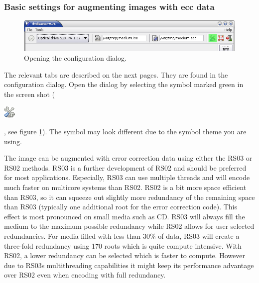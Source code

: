 

\subsubsection{Basic settings for augmenting images with ecc data}
\label{howto-augment-basic-settings}

\begin{figure}[h]
\centerline{\includegraphics[width=\textwidth]{screenshots/global-prefs-invoke.png}}
\caption{Opening the configuration dialog.}  
\label{howto-eccfile-open-preferences-augment}
\end{figure}

The relevant tabs are described on the next pages. They are
found in the configuration dialog.
Open the dialog by selecting the symbol marked green in the
screen shot ( \begin{minipage}{8mm}\includegraphics{icons/prefs-icon.png}\end{minipage}, see figure \ref{howto-eccfile-open-preferences-augment}).
The symbol may look different due to the symbol theme you are using.

\medskip

The image can be augmented with error correction data using either
the RS03 or RS02 methods. RS03 is a further development of RS02
and should be preferred for most applications. Especially, RS03
can use multiple threads and will encode much faster on multicore systems
than RS02. RS02 is a bit more space efficient than RS03, so it can
squeeze out slightly more redundancy of the remaining space than
RS03 (typically one additional root for the error correction code). This
effect is most pronounced on small media such as CD. RS03 will always fill
the medium to the maximum possible redundancy while RS02 allows for user
selected redundancies. For media filled with less than 30\% of data,
RS03 will create a three-fold redundancy using 170 roots which
is quite compute intensive. With RS02, a lower redundancy can be
selected which is faster to compute. However due to RS03s multithreading
capabilities it might keep its performance advantage over RS02 even
when encoding with full redundancy. 

